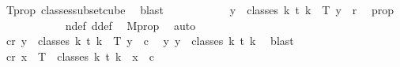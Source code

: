 \begin{isabellebody}
\ T{\isacharunderscore}{\kern0pt}prop\ classes{\isacharunderscore}{\kern0pt}subset{\isacharunderscore}{\kern0pt}cube\ \isamarkupfalse%
\ blast\isanewline
\ \ \ \ \ \ \ \ \isamarkupfalse%
\ \isamarkupfalse%
\ {\isachardoublequoteopen}{\isasymforall}y\ {\isasymin}\ classes\ {\isacharparenleft}{\kern0pt}k{\isacharplus}{\kern0pt}{}{\isacharparenright}{\kern0pt}\ t\ {\isacharparenleft}{\kern0pt}k{\isacharplus}{\kern0pt}{}{\isacharparenright}{\kern0pt}{\isachardot}{\kern0pt}\ {\isasymchi}\ {\isacharparenleft}{\kern0pt}T\ y{\isacharparenright}{\kern0pt}\ {\isacharless}{\kern0pt}\ r{\isachardoublequoteclose}\ \isamarkupfalse%
\ {\isasymchi}{\isacharunderscore}{\kern0pt}prop\ \isanewline
\ \ \ \ \ \ \ \ \ \ \isamarkupfalse%
\ n{\isacharunderscore}{\kern0pt}def\ d{\isacharunderscore}{\kern0pt}def\ \isamarkupfalse%
\ M{\isacharprime}{\kern0pt}{\isacharunderscore}{\kern0pt}prop\ \isamarkupfalse%
\ auto\ \isanewline
\ \ \ \ \ \ \ \ \isamarkupfalse%
\ \isamarkupfalse%
\ {\isachardoublequoteopen}{\isasymexists}c{\isacharless}{\kern0pt}r{\isachardot}{\kern0pt}\ {\isasymforall}y\ {\isasymin}\ classes\ {\isacharparenleft}{\kern0pt}k{\isacharplus}{\kern0pt}{}{\isacharparenright}{\kern0pt}\ t\ {\isacharparenleft}{\kern0pt}k{\isacharplus}{\kern0pt}{}{\isacharparenright}{\kern0pt}{\isachardot}{\kern0pt}\ {\isasymchi}\ {\isacharparenleft}{\kern0pt}T\ y{\isacharparenright}{\kern0pt}\ {\isacharequal}{\kern0pt}\ c{\isachardoublequoteclose}\ \isamarkupfalse%
\ {\isacartoucheopen}{\isasymexists}{\isacharbang}{\kern0pt}y{\isachardot}{\kern0pt}\ y\ {\isasymin}\ classes\ {\isacharparenleft}{\kern0pt}k{\isacharplus}{\kern0pt}{}{\isacharparenright}{\kern0pt}\ t\ {\isacharparenleft}{\kern0pt}k{\isacharplus}{\kern0pt}{}{\isacharparenright}{\kern0pt}{\isacartoucheclose}\ \isamarkupfalse%
\ blast\isanewline
\ \ \ \ \ \ \isamarkupfalse%
\isanewline
\ \ \ \ \ \ \isamarkupfalse%
\ \isamarkupfalse%
\ {\isachardoublequoteopen}{\isasymexists}c{\isacharless}{\kern0pt}r{\isachardot}{\kern0pt}\ {\isasymforall}x\ {\isasymin}\ T\ {\isacharbackquote}{\kern0pt}\ classes\ {\isacharparenleft}{\kern0pt}k{\isacharplus}{\kern0pt}{}{\isacharparenright}{\kern0pt}\ t\ {\isacharparenleft}{\kern0pt}k{\isacharplus}{\kern0pt}{}{\isacharparenright}{\kern0pt}{\isachardot}{\kern0pt}\ {\isasymchi}\ x\ {\isacharequal}{\kern0pt}\ c{\isachardoublequoteclose}\ \isamarkupfalse%

\end{isabellebody}
